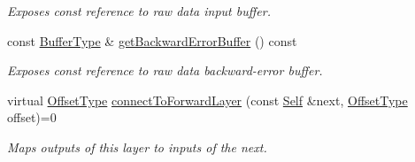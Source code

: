 \begin{DoxyCompactItemize}
\begin{DoxyCompactList}\small\item\em Exposes const reference to raw data input buffer. \end{DoxyCompactList}\item 
const \hyperlink{classffnn_1_1layer_1_1_layer_a981f9bea21513a7b61222b1cda9294e7}{Buffer\-Type} \& \hyperlink{classffnn_1_1layer_1_1_layer_a3f3adf7407280fcc52b529a01b265020}{get\-Backward\-Error\-Buffer} () const 
\begin{DoxyCompactList}\small\item\em Exposes const reference to raw data backward-\/error buffer. \end{DoxyCompactList}\item 
virtual \hyperlink{classffnn_1_1layer_1_1internal_1_1_interface_adc5bb454329ebd51ac26579a43c006fd}{Offset\-Type} \hyperlink{classffnn_1_1layer_1_1_layer_a6e3b760b6e6fa491b78f4ed0551fda85}{connect\-To\-Forward\-Layer} (const \hyperlink{classffnn_1_1layer_1_1_layer_af2600ebac2bf33f5a1fb3307d7ef1dbc}{Self} \&next, \hyperlink{classffnn_1_1layer_1_1internal_1_1_interface_adc5bb454329ebd51ac26579a43c006fd}{Offset\-Type} offset)=0
\begin{DoxyCompactList}\small\item\em Maps outputs of this layer to inputs of the next. \end{DoxyCompactList}\end{DoxyCompactItemize}
